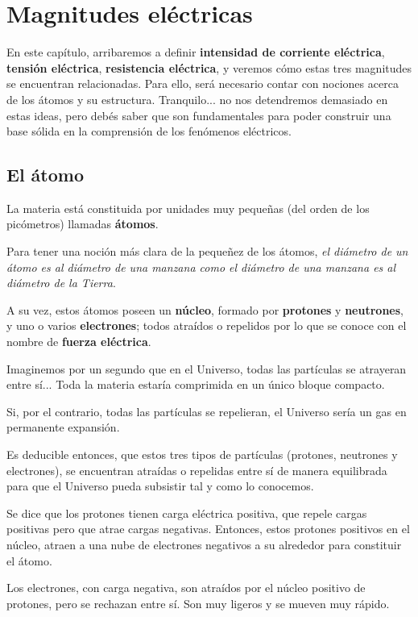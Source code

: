 \chapter{Magnitudes eléctricas}

En este capítulo, arribaremos a definir \textbf{intensidad de corriente eléctrica}, \textbf{tensión eléctrica}, \textbf{resistencia eléctrica}, y veremos cómo estas tres magnitudes se encuentran relacionadas. Para ello, será necesario contar con nociones acerca de los átomos y su estructura. Tranquilo... no nos detendremos demasiado en estas ideas, pero debés saber que son fundamentales para poder construir una base sólida en la comprensión de los fenómenos eléctricos.

\section{El átomo}

La materia está constituida por unidades muy pequeñas (del orden de los picómetros) llamadas \textbf{átomos}.

Para tener una noción más clara de la pequeñez de los átomos, \textit{el diámetro de un átomo es al diámetro de una manzana como el diámetro de una manzana es al diámetro de la Tierra}.

A su vez, estos átomos poseen un \textbf{núcleo}, formado por \textbf{protones} y \textbf{neutrones}, y uno o varios \textbf{electrones}; todos atraídos o repelidos por lo que se conoce con el nombre de \textbf{fuerza eléctrica}.

Imaginemos por un segundo que en el Universo, todas las partículas se atrayeran entre sí... Toda la materia estaría comprimida en un único bloque compacto.

Si, por el contrario, todas las partículas se repelieran, el Universo sería un gas en permanente expansión.

Es deducible entonces, que estos tres tipos de partículas (protones, neutrones y electrones), se encuentran atraídas o repelidas entre sí de manera equilibrada para que el Universo pueda subsistir tal y como lo conocemos.

Se dice que los protones tienen carga eléctrica positiva, que repele cargas positivas pero que atrae cargas negativas. Entonces, estos protones positivos en el núcleo, atraen a una nube de electrones negativos a su alrededor para constituir el átomo.

Los electrones, con carga negativa, son atraídos por el núcleo positivo de protones, pero se rechazan entre sí. Son muy ligeros y se mueven muy rápido. 

